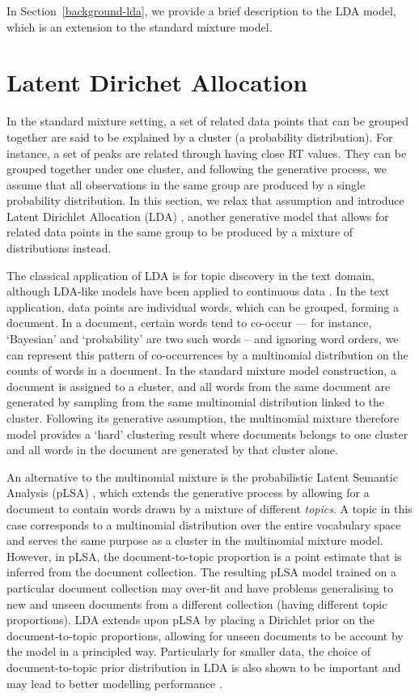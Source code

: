 In Section~\ref{background-lda}, we provide a brief description to the LDA model, which is an extension to the standard mixture model. 

\section{Latent Dirichet Allocation\label{background-lda}}

In the standard mixture setting, a set of related data points that can be grouped together are said to be explained by a cluster (a probability distribution). For instance, a set of peaks are related through having close RT values. They can be grouped together under one cluster, and following the generative process, we assume that all observations in the same group are produced by a single probability distribution. In this section, we relax that assumption and introduce Latent Dirichlet Allocation (LDA) \cite{Blei2003}, another generative model that allows for related data points in the same group to be produced by a mixture of distributions instead.

The classical application of LDA is for topic discovery in the text domain, although LDA-like models have been applied to continuous data \cite{rogers2005latent,weinshall2013lda,das2015gaussian}. In the text application, data points are individual words, which can be grouped, forming a document. In a document, certain words tend to co-occur --- for instance, `Bayesian' and `probability' are two such words -- and ignoring word orders, we can represent this pattern of co-occurrences by a multinomial distribution on the counts of words in a document. In the standard mixture model construction, a document is assigned to a cluster, and all words from the same document are generated by sampling from the same multinomial distribution linked to the cluster. Following its generative assumption, the multinomial mixture therefore model provides a `hard' clustering result where documents belongs to one cluster and all words in the document are generated by that cluster alone. 

An alternative to the multinomial mixture is the probabilistic Latent Semantic Analysis (pLSA) \cite{hofmann1999probabilistic}, which extends the generative process by allowing for a document to contain words drawn by a mixture of different \emph{topics}. A topic in this case corresponds to a multinomial distribution over the entire vocabulary space and serves the same purpose as a cluster in the multinomial mixture model. However, in pLSA, the document-to-topic proportion is a point estimate that is inferred from the document collection. The resulting pLSA model trained on a particular document collection may over-fit and have problems generalising to new and unseen documents from a different collection (having different topic proportions). LDA extends upon pLSA by placing a Dirichlet prior on the document-to-topic proportions, allowing for unseen documents to be account by the model in a principled way. Particularly for smaller data, the choice of document-to-topic prior distribution in LDA is also shown to be important and may lead to better modelling performance \cite{wallach2009rethinking}.

